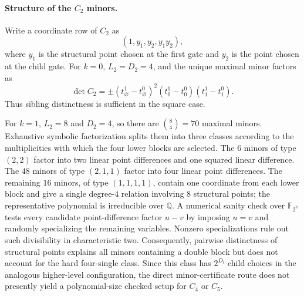 \paragraph{Structure of the \(C_2\) minors.}
Write a coordinate row of \(C_2\) as
\[
  (1,y_1,y_2,y_1y_2),
\]
where \(y_1\) is the structural point chosen at the first gate and \(y_2\) is
the point chosen at the child gate.  For \(k=0\), \(L_2=D_2=4\), and the
unique maximal minor factors as
\[
  \det C_2
  = \pm (t_{\varnothing}^{1}-t_{\varnothing}^{0})^2
      (t_{0}^{1}-t_{0}^{0})
      (t_{1}^{1}-t_{1}^{0}).
\]
Thus sibling distinctness is sufficient in the square case.

For \(k=1\), \(L_2=8\) and \(D_2=4\), so there are
\(\binom{8}{4}=70\) maximal minors.  Exhaustive symbolic factorization
splits them into three classes according to the multiplicities with which
the four lower blocks are selected.  The \(6\) minors of type \((2,2)\)
factor into two linear point differences and one squared linear
difference.  The \(48\) minors of type \((2,1,1)\) factor into four linear
point differences.  The remaining \(16\) minors, of type
\((1,1,1,1)\), contain one coordinate from each lower block and give a
single degree-\(4\) relation involving \(8\) structural points; the
representative polynomial is irreducible over \(\mathbb{Q}\).
A numerical sanity check over \(\mathbb{F}_{2^8}\) tests every candidate
point-difference factor \(u-v\) by imposing \(u=v\) and randomly
specializing the remaining variables.  Nonzero specializations rule out
such divisibility in characteristic two.  Consequently, pairwise
distinctness of structural points explains all minors containing a double
block but does not account for the hard four-single class.  Since this
class has \(2^{D_i}\) child choices in the analogous higher-level
configuration, the direct minor-certificate route does not presently
yield a polynomial-size checked setup for \(C_4\) or \(C_5\).
